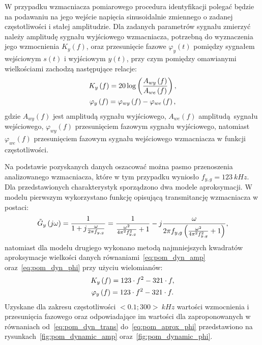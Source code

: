 W przypadku wzmacniacza pomiarowego procedura identyfikacji polegać będzie na podawaniu na jego wejście napięcia sinusoidalnie zmiennego o zadanej częstotliwości i stałej amplitudzie. Dla zadanych parametrów sygnału zmierzyć należy amplitudę sygnału wyjściowego wzmacniacza, potrzebną do wyznaczenia jego wzmocnienia $K_{y}(f)$, oraz przesunięcie fazowe $\varphi_{y}(t)$ pomiędzy sygnałem wejściowym $s(t)$ i wyjściowym $y(t)$, przy czym pomiędzy omawianymi wielkościami zachodzą następujące relacje:
\begin{gather}
K_{y} \left(f\right) = 20 \log \left( \frac{A_{wy} \left(f\right)}{A_{we} \left(f\right)} \right) \label{eq:pom_dyn_amp}, \\
\varphi_{y} \left(f\right) = \varphi_{wy} \left(f\right) - \varphi_{we} \left(f\right) \label{eq:pom_dyn_phi},
\end{gather}
gdzie $A_{wy}(f)$ jest amplitudą sygnału wyjściowego, $A_{we}(f)$ amplitudą sygnału wejściowego, $\varphi_{wy}(f)$ przesunięciem fazowym sygnału wyjściowego, natomiast $\varphi_{we}(f)$ przesunięciem fazowym sygnału wejściowego wzmacniacza w funkcji częstotliwości.

Na podstawie pozyskanych danych oszacować można pasmo przenoszenia analizowanego wzmacniacza, które w tym przypadku wyniosło $f_{y,g} = \qty{123}{kHz}$. Dla przedstawionych charakterystyk sporządzono dwa modele aproksymacji. W modelu pierwszym wykorzystano funkcję opisującą transmitancję wzmacniacza w postaci:
\begin{gather}
\tilde{G}_{y} \left(j\omega\right) = \frac{1}{1 + j \frac{\omega}{2 \pi f_{y,g}}} = \frac{1}{\frac{\omega^{2}}{4 \pi^{2} f_{y,g}^{2}} + 1} - j \frac{\omega}{2 \pi f_{y,g} \left( \frac{\omega^{2}}{4 \pi^{2} f_{y,g}^{2}} + 1 \right) } \label{eq:pom_dyn_trans},
\end{gather}
natomiast dla modelu drugiego wykonano metodą najmniejszych kwadratów aproksymacje wielkości danych równaniami~\eqref{eq:pom_dyn_amp} oraz~\eqref{eq:pom_dyn_phi} przy użyciu wielomianów:
\begin{gather}
K_{y} \left(f\right) = 123 \cdot f^{2} - 321 \cdot f \label{eq:pom_aprox_amp}, \\
\varphi_{y} \left(f\right) = 123 \cdot f^{2} - 321 \cdot f \label{eq:pom_aprox_phi}.
\end{gather}
Uzyskane dla zakresu częstotliwości $<0.1;300>~\unit{kHz}$ wartości wzmocnienia i przesunięcia fazowego oraz odpowiadające im wartości dla zaproponowanych w równaniach od~\eqref{eq:pom_dyn_trans} do~\eqref{eq:pom_aprox_phi} przedstawiono na rysunkach~\ref{fig:pom_dynamic_amp} oraz~\ref{fig:pom_dynamic_phi}.

